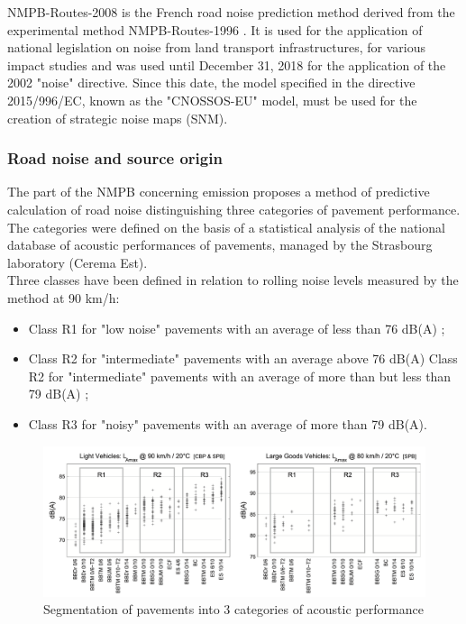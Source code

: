 \documentclass{article}
\begin{document}
\noindent NMPB-Routes-2008 is the French road noise prediction method derived from the experimental method NMPB-Routes-1996 \cite{Hamet2010}. It is used for the application of national legislation on noise from land transport infrastructures, for various impact studies and was used until December 31, 2018 for the application of the 2002 "noise" directive. Since this date, the model specified in the directive 2015/996/EC, known as the "CNOSSOS-EU" model, must be used for the creation of strategic noise maps (SNM).

\subsubsection{Road noise and source origin}

\noindent The part of the NMPB concerning emission proposes a method of predictive calculation of road noise distinguishing three categories of pavement performance. The categories were defined on the basis of a statistical analysis of the national database of acoustic performances of pavements, managed by the Strasbourg laboratory (Cerema Est).\\
Three classes have been defined in relation to rolling noise levels measured by the method at 90 km/h: 
\begin{itemize}
    \item Class R1 for "low noise" pavements with an average of less than 76 dB(A) ;
    \item Class R2 for "intermediate" pavements with an average above 76 dB(A) Class R2 for "intermediate" pavements with an average of more than but less than 79 dB(A) ;
    \item Class R3 for "noisy" pavements with an average of more than 79 dB(A).
\end{itemize}

\begin{figure}[H]
\caption{Segmentation of pavements into 3 categories of acoustic performance
}
\label{Segmentation of pavements}
\centering
\includegraphics[width=1\textwidth]{NMPB/Pavement_segmentation.png}
\end{figure}
\end{document}
